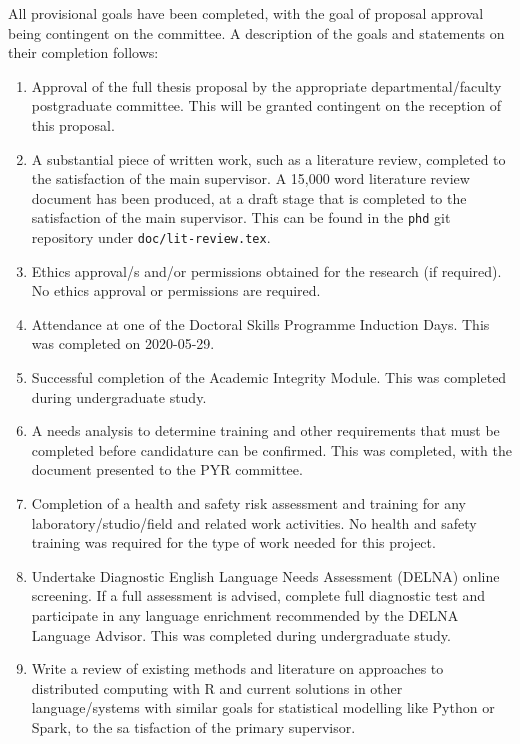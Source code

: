 All provisional goals have been completed, with the goal of proposal approval being contingent on the committee.
A description of the goals and statements on their completion follows:

\begin{enumerate}
        \item Approval of the full thesis proposal by the appropriate departmental/faculty postgraduate committee.
                This will be granted contingent on the reception of this proposal.
        \item A substantial piece of written work, such as a literature review, completed to the satisfaction of the main supervisor.
                A 15,000 word literature review document has been produced, at a draft stage that is completed to the satisfaction of the main supervisor.
                This can be found in the \texttt{phd} git repository under \texttt{doc/lit-review.tex}.
        \item Ethics approval/s and/or permissions obtained for the research (if required).
                No ethics approval or permissions are required.
        \item Attendance at one of the Doctoral Skills Programme Induction Days.
                This was completed on 2020-05-29.
        \item Successful completion of the Academic Integrity Module.
                This was completed during undergraduate study.
        \item A needs analysis to determine training and other requirements that must be completed before candidature can be confirmed.
                This was completed, with the document presented to the PYR committee.
        \item Completion of a health and safety risk assessment and training for any laboratory/studio/field and related work activities.
                No health and safety training was required for the type of work needed for this project.
        \item Undertake Diagnostic English Language Needs Assessment (DELNA) online screening.
                If a full assessment is advised, complete full diagnostic test and participate in any language enrichment recommended by the DELNA Language Advisor.
                This was completed during undergraduate study.
        \item Write a review of existing methods and literature on approaches to distributed computing with R and current solutions in other language/systems with similar goals for statistical modelling like Python or Spark, to the sa    tisfaction of the primary supervisor.

\end{enumerate}
